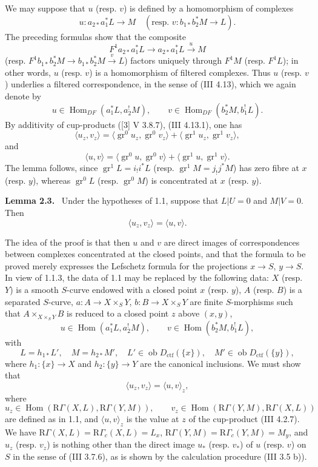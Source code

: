 \documentclass[11pt]{article}
\newenvironment{statement}[1]{\par\medskip\noindent\textbf{#1.}\ }{\par\medskip}
\DeclareMathOperator{\Hom}{Hom}
\providecommand{\Ob}{\operatorname{ob}}
\begin{document}
We may suppose that $u$ (resp. $v$) is defined by a homomorphism of complexes
\[
u:a_{2*}a_1^*L\longrightarrow M
\quad
(\text{resp. }v:b_{1*}b_2^*M\longrightarrow L).
\]
The preceding formulas show that the composite
\[
F^1a_{2*}a_1^*L\longrightarrow a_{2*}a_1^*L\xrightarrow{u}M
\]
(resp. $F^1b_{1*}b_2^*M\to b_{1*}b_2^*M\xrightarrow{v}L$) factors uniquely through $F^1M$ (resp. $F^1L$); in other words, $u$ (resp. $v$) is a homomorphism of filtered complexes. Thus $u$ (resp. $v$) underlies a filtered correspondence, in the sense of (III 4.13), which we again denote by
\[
u\in\Hom_{DF}(a_1^*L,a_2^!M),\qquad
v\in\Hom_{DF}(b_2^*M,b_1^!L).
\]
By additivity of cup-products ([3] V 3.8.7), (III 4.13.1), one has
\[
\langle u_z,v_z\rangle
 =\langle \operatorname{gr}^0u_z,\operatorname{gr}^0v_z\rangle
 +\langle \operatorname{gr}^1u_z,\operatorname{gr}^1v_z\rangle,
\]
and
\[
\langle u,v\rangle
 =\langle \operatorname{gr}^0u,\operatorname{gr}^0v\rangle
 +\langle \operatorname{gr}^1u,\operatorname{gr}^1v\rangle.
\]
The lemma follows, since $\operatorname{gr}^1L=i_!i^*L$ (resp. $\operatorname{gr}^1M=j_!j^*M$) has zero fibre at $x$ (resp. $y$), whereas $\operatorname{gr}^0L$ (resp. $\operatorname{gr}^0M$) is concentrated at $x$ (resp. $y$).

\begin{statement}{Lemma 2.3}
Under the hypotheses of 1.1, suppose that $L|U=0$ and $M|V=0$. Then
\[
\langle u_z,v_z\rangle=\langle u,v\rangle .
\]
\end{statement}

The idea of the proof is that then $u$ and $v$ are direct images of correspondences between complexes concentrated at the closed points, and that the formula to be proved merely expresses the Lefschetz formula for the projections $x\to S$, $y\to S$. In view of 1.1.3, the data of 1.1 may be replaced by the following data: $X$ (resp. $Y$) is a smooth $S$-curve endowed with a closed point $x$ (resp. $y$), $A$ (resp. $B$) is a separated $S$-curve, $a:A\to X\times_S Y$, $b:B\to X\times_S Y$ are finite $S$-morphisms such that $A\times_{X\times_SY}B$ is reduced to a closed point $z$ above $(x,y)$,
\[
u\in\Hom(a_1^*L,a_2^!M),\qquad v\in\Hom(b_2^*M,b_1^!L),
\]
with
\[
L=h_{1*}L',\quad M=h_{2*}M',\quad
L'\in\Ob D_{\mathrm{ctf}}(\{x\}),\quad M'\in\Ob D_{\mathrm{ctf}}(\{y\}),
\]
where $h_1:\{x\}\to X$ and $h_2:\{y\}\to Y$ are the canonical inclusions. We must show that
\[
\langle u_z,v_z\rangle=\langle u,v\rangle_z,
\]
where
\[
u_z\in\Hom(\mathrm R\Gamma(X,L),\mathrm R\Gamma(Y,M)),\qquad
v_z\in\Hom(\mathrm R\Gamma(Y,M),\mathrm R\Gamma(X,L))
\]
are defined as in 1.1, and $\langle u,v\rangle_z$ is the value at $z$ of the cup-product (III 4.2.7). We have $\mathrm R\Gamma(X,L)=\mathrm R\Gamma_c(X,L)=L_x$, $\mathrm R\Gamma(Y,M)=\mathrm R\Gamma_c(Y,M)=M_y$, and $u_z$ (resp. $v_z$) is nothing other than the direct image $u_*$ (resp. $v_*$) of $u$ (resp. $v$) on $S$ in the sense of (III 3.7.6), as is shown by the calculation procedure (III 3.5 b)).
\end{document}
